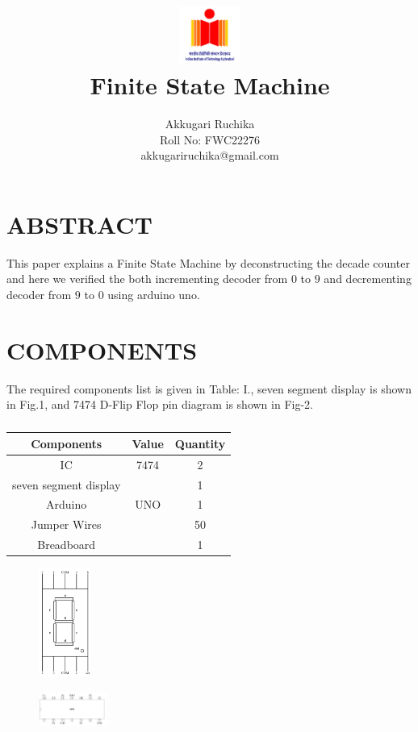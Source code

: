 \documentclass[conference]{IEEEtran}
\title{
\vspace{1cm}
{\includegraphics[width=0.15\textwidth]{iithlogo.jpg} \\ Finite State Machine} }
\author{Akkugari Ruchika \\ Roll No: FWC22276 \\ akkugariruchika@gmail.com}
\begin{document}
\maketitle
 \section {ABSTRACT}
 This paper explains a Finite State Machine by deconstructing the decade counter and here we verified the both incrementing decoder from $0$ to $9$ and decrementing decoder from $9$ to $0$ using arduino uno.

\section{COMPONENTS}
The required components list is given in Table: I., seven segment display is shown in Fig.1, and 7474 D-Flip Flop pin diagram is shown in Fig-2.
\vspace{0.3cm}
 \begin{table} [htbp]
\centering
\begin{tabular}{| c | c | c |} \hline
Components & Value & Quantity \\\hline
IC & 7474 & 2 \\ \hline
seven segment display & & 1\\ \hline
Arduino & UNO & 1 \\ \hline
Jumper Wires &  & 50 \\ \hline
Breadboard & & 1 \\ 
\hline
\end{tabular}
\vspace{0.3cm}
\caption{\label{tab:widgets}}
\end{table}

\begin{figure}[h]                           
\centering                                 
\includegraphics[width=0.15\textwidth]{fig1.jpg}                                           
\caption{\label{fig-1:Gates}}               
\end{figure}

\begin{figure}[h]                           
\centering                                 
\includegraphics[width=0.2\textwidth]{fig2.jpg  }                                           
\caption{\label{fig-2:Gates}}               
\end{figure}
\end{document}
